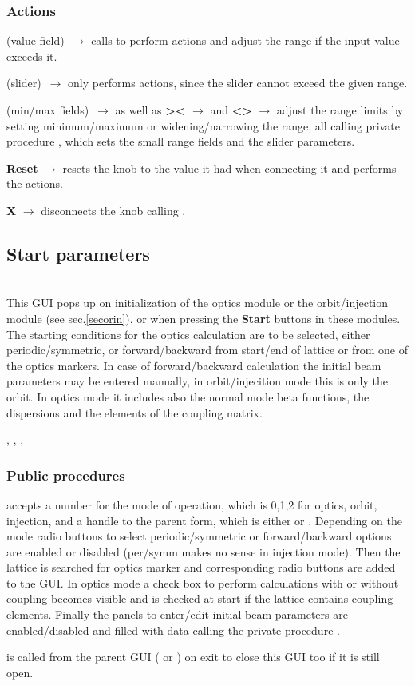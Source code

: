 \documentclass[12pt]{article}
\newcommand\code[1]{{\tt #1}}
\newcommand{\ofld}[1]{\colorbox{black!15}{{{\color{black}\bf #1}}}}
\newcommand{\ofldx}[1]{\colorbox{black!15}{{\color{black}(#1)}}}
\newcommand\guico[1]{{\color{blue}\code{#1}}}
\newcommand\guifco[1]{{\color{violet}\code{#1}}}
\newcommand{\evcodf}[2]{\ofld{#1} $\rightarrow$ \guifco{#2}}
\newcommand{\evcodxf}[2]{\ofldx{#1}~$\rightarrow$ \guifco{#2}}
\newcommand{\opagui}[1]{\colorbox{blue!20}{{\color{black}\code{#1}}}}
\newcommand{\oguih}[2]{\subsection{\label{#2}#1}{\Huge\opagui{#2}}\\}
\newcommand{\ogui}[1]{\hyperref[#1]{\opagui{#1}}}
\newcommand{\opauni}[1]{\colorbox{orange!30}{{\color{black}\code{#1}}}}
\newcommand{\ouni}[1]{\hyperref[#1]{\opauni{#1}}}
\newcommand{\uses}[1]{\flushleft {\bf Uses:} #1}
\newcommand{\desc}[1]{#1}
\newcommand{\act}[1]{\subsubsection*{Actions} #1}
\newcommand{\ppro}[1]{\subsubsection*{Public procedures} #1}
\begin{document}
\act{
\evcodxf{value field}{editKKeyPress} calls \guifco{KUpdate} to perform actions and adjust the range if the input value exceeds it.

\evcodxf{slider}{sliderScroll} only performs actions, since the slider cannot exceed the given range.

\evcodxf{min/max fields}{editmin/maxKeyPress} as well as \evcodf{\textgreater\textless}{butwidClick} and \evcodf{\textless\textgreater}{butnarClick} adjust the range limits by setting minimum/maximum or widening/narrowing the range, all calling private procedure \guifco{SetKrange}, which sets the small range fields and the slider parameters.

\evcodf{Reset}{butresClick} resets the knob to the value it had when connecting it and performs the actions.

\evcodf{X}{butfreeClick} disconnects the knob calling \guifco{Unload}.
}

\oguih{Start parameters}{ostartmenu} 

\desc{This GUI pops up on initialization of the optics module  \ogui{opalinop} or the orbit/injection module \ogui{opaorbit} (see sec.\ref{secorin}), or when pressing the \ofld{Start} buttons in these modules. The starting conditions for the optics calculation are to be selected, either periodic/symmetric, or forward/backward from start/end of lattice or from one of the optics markers. In case of forward/backward calculation the initial beam parameters may be entered manually, in orbit/injecition mode this is only the orbit. In optics mode it includes also the normal mode beta functions, the dispersions and the elements of the coupling matrix.}

\uses{\ouni{linoplib}, \ouni{globlib}, \ouni{mathlib}, \ouni{comauxlib}} 

\ppro{
\guico{Load} accepts a number for the mode of operation, which is 0,1,2 for optics, orbit, injection, and a handle to the parent form, which is either \ogui{opalinop} or \ogui{opaorbit}. Depending on the mode radio buttons to select periodic/symmetric or forward/backward options are enabled or disabled (per/symm makes no sense in injection mode). Then the lattice is searched for optics marker and corresponding radio buttons are added to the GUI. In optics mode a check box to perform calculations with or without coupling becomes visible and is checked at start if the lattice contains coupling elements. Finally the panels to enter/edit initial beam parameters are enabled/disabled and filled with data calling the private procedure \guico{set\_pan\_ini}.

\guico{Exit} is called from the parent GUI (\ogui{opalinop} or \ogui{opaorbit}) on exit to close this GUI too if it is still open.
}
\end{document}
